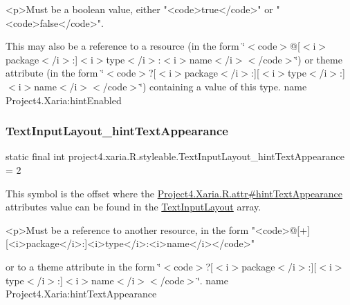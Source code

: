 \begin{DoxyVerb}      <p>Must be a boolean value, either "<code>true</code>" or "<code>false</code>".
\end{DoxyVerb}
 

This may also be a reference to a resource (in the form \char`\"{}$<$code$>$@\mbox{[}$<$i$>$package$<$/i$>$\+:\mbox{]}$<$i$>$type$<$/i$>$\+:$<$i$>$name$<$/i$>$$<$/code$>$\char`\"{}) or theme attribute (in the form \char`\"{}$<$code$>$?\mbox{[}$<$i$>$package$<$/i$>$\+:\mbox{]}\mbox{[}$<$i$>$type$<$/i$>$\+:\mbox{]}$<$i$>$name$<$/i$>$$<$/code$>$\char`\"{}) containing a value of this type.  name Project4.\+Xaria\+:hint\+Enabled \mbox{\label{classproject4_1_1xaria_1_1R_1_1styleable_a309a9958fd85c366ec2a1e08ff0f0212}} 
\subsubsection{\texorpdfstring{Text\+Input\+Layout\+\_\+hint\+Text\+Appearance}{TextInputLayout\_hintTextAppearance}}
{\footnotesize\ttfamily static final int project4.\+xaria.\+R.\+styleable.\+Text\+Input\+Layout\+\_\+hint\+Text\+Appearance = 2\hspace{0.3cm}{\ttfamily [static]}}

This symbol is the offset where the \hyperlink{}{Project4.\+Xaria.\+R.\+attr\#hint\+Text\+Appearance} attribute\textquotesingle{}s value can be found in the \hyperlink{classproject4_1_1xaria_1_1R_1_1styleable_a5a2e4611c17d75c805194b416b9fed74}{Text\+Input\+Layout} array.

\begin{DoxyVerb}      <p>Must be a reference to another resource, in the form "<code>@[+][<i>package</i>:]<i>type</i>:<i>name</i></code>"
\end{DoxyVerb}
 or to a theme attribute in the form \char`\"{}$<$code$>$?\mbox{[}$<$i$>$package$<$/i$>$\+:\mbox{]}\mbox{[}$<$i$>$type$<$/i$>$\+:\mbox{]}$<$i$>$name$<$/i$>$$<$/code$>$\char`\"{}.  name Project4.\+Xaria\+:hint\+Text\+Appearance \mbox{\label{classproject4_1_1xaria_1_1R_1_1styleable_af6c30f9e9e086f6bf4e510669443fa59}} 
